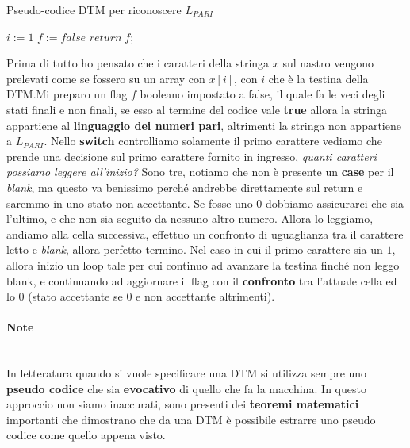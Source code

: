 \documentclass{article}
\begin{document}
\begin{algorithm}[hbt!]
    \caption{Pseudo-codice DTM per riconoscere $L_{PARI}$}\label{alg:two}
    $i:=1$\;
    $f:=false$\;
    $return\;f;$
\end{algorithm}
Prima di tutto ho pensato che i caratteri della stringa $x$ sul
nastro vengono prelevati come se fossero su un array con $x[i]$,
con $i$ che è la testina della DTM.\newline\newline Mi preparo un flag $f$ booleano impostato
a false, il quale fa le veci degli stati finali e non finali, se esso al termine del
codice vale \textbf{true} allora
la stringa appartiene al \textbf{linguaggio dei numeri pari}, altrimenti la stringa non appartiene
a $L_{PARI}$.\newline\newline
Nello \textbf{switch} controlliamo solamente il primo carattere vediamo che prende una
decisione sul primo carattere fornito
in ingresso, \textit{quanti caratteri possiamo leggere all'inizio?}
Sono tre, notiamo che non è presente un
\textbf{case} per il \textit{blank}, ma questo va benissimo perché andrebbe
direttamente sul return e saremmo in uno stato non accettante.\newline\newline
Se fosse uno $0$ dobbiamo assicurarci che sia l'ultimo, e che non sia seguito
da nessuno altro numero. Allora lo leggiamo, andiamo alla cella successiva,
effettuo un confronto di uguaglianza tra il carattere letto e \textit{blank},
allora perfetto termino. Nel caso in cui il primo carattere sia un $1$, allora
inizio un loop tale per cui continuo ad avanzare la testina finché non leggo
blank, e continuando ad aggiornare il flag con il \textbf{confronto} tra l'attuale
cella ed lo 0 (stato accettante se 0 e non accettante altrimenti).

\paragraph{Note}\mbox{}\\
In letteratura quando si vuole specificare una DTM si utilizza sempre uno
\textbf{pseudo codice} che sia \textbf{evocativo} di quello che fa la macchina.
In questo approccio non siamo inaccurati, sono presenti dei \textbf{teoremi matematici}
importanti che dimostrano che da una DTM è possibile estrarre uno pseudo codice
come quello appena visto.
\end{document}
